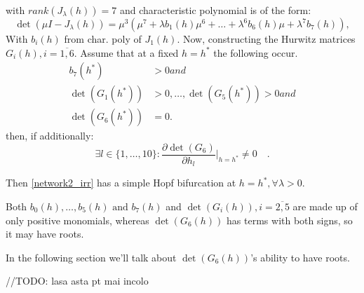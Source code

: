 with $rank(J_\lambda(h)) = 7$ and characteristic polynomial is of the form:
\[
	\det\left(\mu I-J_\lambda(h)\right)=\mu^3\left(\mu^7+\lambda b_1(h)\mu^6+\ldots+\lambda^6b_6(h)\mu+\lambda^7b_7(h)\right),
\]
With $b_i(h)$ from char. poly of $J_1(h)$.
Now, constructing the Hurwitz matrices $G_i(h), i = \overline{1,6}$. Assume that at a fixed $h = h^*$ the following occur.
\[
	\begin{aligned}b_{7}(h^{*})&>0and\\\det(G_1(h^*))&>0,\ldots,\det(G_5(h^*))>0and\\\det(G_6(h^*))&=0.
	\end{aligned}
\]
then, if additionally:
\[
	\exists l\in\{1,\ldots,10\} : \frac{\partial\det(G_6)}{\partial h_l}|_{h=h^*}\neq0\quad.
\]

Then \ref{network2_irr} has a simple Hopf bifurcation at $h = h^*, \forall \lambda > 0$.

Both $b_0(h), \ldots, b_5(h) \text{ and } b_7(h)$ and
$\det(G_i(h)), i = \overline{2,5}$ are made up of only positive monomials, whereas $\det(G_6(h))$ has terms with both signs, so it may have roots.

In the following section we'll talk about $\det(G_6(h))$'s ability to have roots.

\hfill\break
\hfill\break
//TODO: lasa asta pt mai incolo

